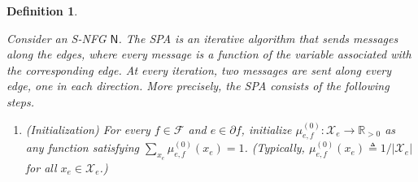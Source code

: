 \documentclass[journal]{IEEEtran}
\newcommand{\add}[1]{{\color{black}#1}}
\newtheorem{definition}[theorem]{Definition}
\newcommand{\setF}{ \mathcal{F} }
\newcommand{\setpf}{ \partial f }
\newcommand{\sR}{\mathbb{R}}
\newcommand{\xe}{ x_{e} }
\newcommand{\setxe}{ \mathcal{X}_{e} }
\newcommand{\graphN}{ \mathsf{N} }
\newcommand{\defeq}{ \triangleq }
\newcommand{\etof}{ e,f }
\begin{document}
\begin{definition}\label{sec:SNFG:def:4}
  \label{def:belief at SPA fixed point for S-NFG}

  \add{Consider an S-NFG $\graphN$. The SPA is an iterative algorithm that
    sends messages along the edges, where every message is a function of the
    variable associated with the corresponding edge. At every iteration, two
    messages are sent along every edge, one in each direction. More
    precisely,} the SPA consists of the following steps.
  \begin{enumerate}

    \item \add{(Initialization) For every $f \in \setF$ and $ e \in \setpf $, initialize
            $\mu_{\etof}^{(0)}: \setxe \to \sR_{> 0}$ as any function satisfying}
          $ \sum_{\xe} \mu_{\etof}^{(0)}(\xe) = 1 $.
          (Typically, $\mu_{\etof}^{(0)}(\xe) \defeq 1 / |\setxe|$
          for all $\xe \in \setxe$.)


\end{enumerate}
\end{definition}
\end{document}
